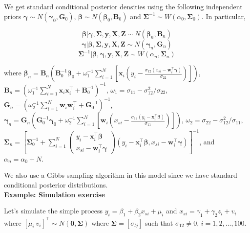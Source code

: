 We get standard conditional posterior densities using the following independent priors $\bm{\gamma}\sim {N}(\bm{\gamma}_0,\bm{G}_0)$, $\bm{\beta}\sim {N}(\bm{\beta}_0,\bm{B}_0)$ and $\bm{\Sigma}^{-1} \sim {W}(\alpha_0,\bm{\Sigma}_0)$.
In particular, 

\begin{equation*}
	\bm{\beta}|\bm{\gamma},\bm{\Sigma},\bm{y},\bm{X},\bm{Z}\sim {N}(\bm{\beta}_n,\bm{B}_n)
\end{equation*}
\begin{equation*}
	\bm{\gamma}|\bm{\beta},\bm{\Sigma},\bm{y},\bm{X},\bm{Z}\sim {N}(\bm{\gamma}_n,\bm{G}_n)
\end{equation*}
\begin{equation*}
	\bm{\Sigma}^{-1}|\bm{\beta},\bm{\gamma},\bm{y},\bm{X},\bm{Z}\sim {W}(\alpha_n,\bm{\Sigma}_n)
\end{equation*}

where $\bm{\beta}_n=\bm{B}_n\left(\bm{B}_0^{-1}\bm{\beta}_0 + \omega_1^{-1}\sum_{i=1}^{N}\left[\bm{x}_i\left(y_i-\frac{\sigma_{12}(x_{si}-\bm{w}_i^{\top}\bm{\gamma})}{\sigma_{22}}\right)\right]\right)$, $\bm{B}_n=(\omega_1^{-1}\sum_{i=1}^{N}\bm{x}_i\bm{x}_i^{\top}+\bm{B}_0^{-1})^{-1}$, $\omega_1=\sigma_{11}-\sigma_{12}^2/\sigma_{22}$, $\bm{G}_n=(\omega_2^{-1}\sum_{i=1}^{N}\bm{w}_i\bm{w}_i^{\top}+\bm{G}_0^{-1})^{-1}$, $\bm{\gamma}_n=\bm{G}_n\left(\bm{G}_0^{-1}\bm{\gamma}_0 + \omega_2^{-1}\sum_{i=1}^{N}\left[\bm{w}_i\left(x_{si}-\frac{\sigma_{12}(y_{i}-\bm{x}_i^{\top}\bm{\beta})}{\sigma_{11}}\right)\right]\right)$,
$\omega_2=\sigma_{22}-\sigma_{12}^2/\sigma_{11}$, $\bm{\Sigma}_n=\left[\bm{\Sigma}_0^{-1}+\sum_{i=1}^N \begin{pmatrix}
	y_i-\bm{x}_i^{\top}\bm{\beta} \\
	x_{si}-\bm{w}_i^{\top}\bm{\gamma}
\end{pmatrix} (y_i-\bm{x}_i^{\top}\bm{\beta}, x_{si} -\bm{w}_i^{\top}\bm{\gamma})\right]^{-1}$, and $\alpha_n=\alpha_0+N$.

We also use a Gibbs sampling algorithm in this model since we have standard conditional posterior distributions.\\

\textbf{Example: Simulation exercise}

Let's simulate the simple process $y_i=\beta_1+\beta_2x_{si}+\mu_i$ and $x_{si}=\gamma_1+\gamma_2z_i+v_i$ where $[\mu_i \ v_i]^{\top}\sim N(\bm{0},\bm{\Sigma})$ where $\bm{\Sigma}=[\sigma_{lj}]$ such that $\sigma_{12}\neq 0$, $i=1,2,\dots,100$.

